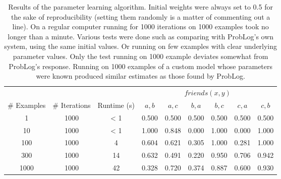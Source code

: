 \begin{table}[h]
\centering
\begin{tabular}{ccc|cccccc}
& & & \multicolumn{6}{c}{$friends(x,y)$}\\
\# Examples & \# Iterations & Runtime (s) & $a,b$ & $a,c$ & $b,a$ & $b,c$ & $c,a$ & $c,b$\\\hline
1 & 1000 & < 1 & 0.500 & 0.500 & 0.500 & 0.500 & 0.500 & 0.500 \\
10 & 1000 & < 1 & 1.000 & 0.848 & 0.000 & 1.000 & 0.000 & 1.000 \\
100 & 1000 & 4 & 0.604 & 0.621 & 0.305 & 1.000 & 0.281 & 1.000 \\
300 & 1000 & 14 & 0.632 & 0.491 & 0.220 & 0.950 & 0.706 & 0.942 \\
1000 & 1000 & 42 & 0.328 & 0.720 & 0.374 & 0.887 & 0.600 & 0.930 \\
\end{tabular}
\caption{Results of the parameter learning algorithm. Initial weights were always set to 0.5 for the sake of reproducibility (setting them randomly is a matter of commenting out a line). On a regular computer running for 1000 iterations on 1000 examples took no longer than a minute. Various tests were done such as comparing with ProbLog's own system, using the same initial values. Or running on few examples with clear underlying parameter values. Only the test running on 1000 example deviates somewhat from ProbLog's response. Running on 1000 examples of a custom model whose parameters were known produced similar estimates as those found by ProbLog.}
\label{plres}
\end{table}

